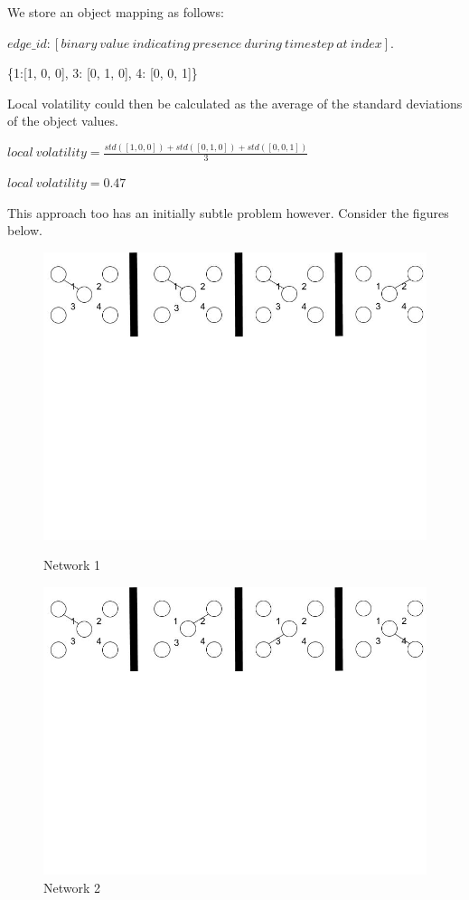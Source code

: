 We store an object mapping as follows:

$edge\_id: [binary\ value\ indicating\ presence\ during\ timestep\ at\ index].$

\begin{center}
\{1:[1, 0, 0], 3: [0, 1, 0], 4: [0, 0, 1]\}
\end{center}
Local volatility could then be calculated as the average of the standard deviations of the object values.
\begin{center}
$local\ volatility = \frac{std([1,0,0]) + std([0,1,0]) + std([0,0,1])}{3}$

$local\ volatility = 0.47$
\end{center}

This approach too has an initially subtle problem however. Consider the figures below.

\begin{figure}[h!]
  \begin{center}
  \includegraphics[trim={0 15cm 0 -1cm}, width=120mm]{./Figures/volatilityLastProblem1.jpg}
  \end{center}
  \caption{Network 1}
  \begin{center}
  \includegraphics[trim={0 15cm 0 -1cm}, width=120mm]{./Figures/volatilityLastProblem2.jpg}
  \end{center}
  \caption{Network 2}
\end{figure}

